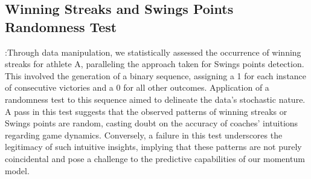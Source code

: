 \documentclass{mcmthesis}
\begin{document}
\subsection{Winning Streaks and Swings Points Randomness Test}:Through data manipulation, we statistically assessed the occurrence of winning streaks for athlete A, paralleling the approach taken for Swings points detection. This involved the generation of a binary sequence, assigning a 1 for each instance of consecutive victories and a 0 for all other outcomes. Application of a randomness test to this sequence aimed to delineate the data's stochastic nature.
A pass in this test suggests that the observed patterns of winning streaks or Swings points are random, casting doubt on the accuracy of coaches' intuitions regarding game dynamics. Conversely, a failure in this test underscores the legitimacy of such intuitive insights, implying that these patterns are not purely coincidental and pose a challenge to the predictive capabilities of our momentum model.
\end{document}
